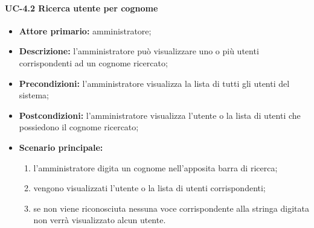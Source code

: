     \paragraph{UC-4.2 Ricerca utente per cognome}
    \begin{itemize}
        \item \textbf{Attore primario:} amministratore; 
    
        \item \textbf{Descrizione:} l'amministratore può visualizzare uno o più utenti corrispondenti ad un cognome ricercato;
    
        \item \textbf{Precondizioni:} l'amministratore visualizza la lista di tutti gli utenti del sistema;
    
        \item \textbf{Postcondizioni:} l'amministratore visualizza l'utente o la lista di utenti che possiedono il cognome ricercato;
    
        \item \textbf{Scenario principale:}
              \begin{enumerate}
                  \item l'amministratore digita un cognome nell'apposita barra di ricerca;
                  \item vengono visualizzati l'utente o la lista di utenti corrispondenti;
                  \item se non viene riconosciuta nessuna voce corrispondente alla stringa digitata non verrà visualizzato alcun utente.
              \end{enumerate}
    \end{itemize}



